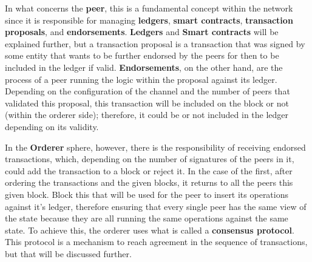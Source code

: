 In what concerns the \textbf{peer}, this is a fundamental concept within the network since it is responsible 
for managing \textbf{ledgers}, \textbf{smart contracts}, \textbf{transaction proposals}, and \textbf{endorsements}. \textbf{Ledgers} and 
\textbf{Smart contracts} will be explained further, but a transaction proposal is a transaction that was signed by 
some entity that wants to be further endorsed by the peers for then to be included in the ledger if valid. \textbf{Endorsements}, on 
the other hand, are the process of a peer running the logic within the proposal against its ledger. Depending on the configuration of 
the channel and the number of peers that validated this proposal, this transaction will be included on the block 
or not (within the orderer side); therefore, it could be or not included in the ledger depending on its validity.

In the \textbf{Orderer} sphere, however, there is the responsibility of receiving endorsed transactions, which, 
depending on the number of signatures of the peers in it, could add the transaction to a block or reject it. In the case of the first,
after ordering the transactions and the given blocks, it returns to all the peers this given block. Block this that will be used 
for the peer to insert its operations against it's ledger, therefore ensuring that every single peer has the same view of the state 
because they are all running the same operations against the same state. To achieve this, the orderer uses what is called a 
\textbf{consensus protocol}. This protocol is a mechanism to reach agreement in the sequence of transactions, but that will 
be discussed further.

